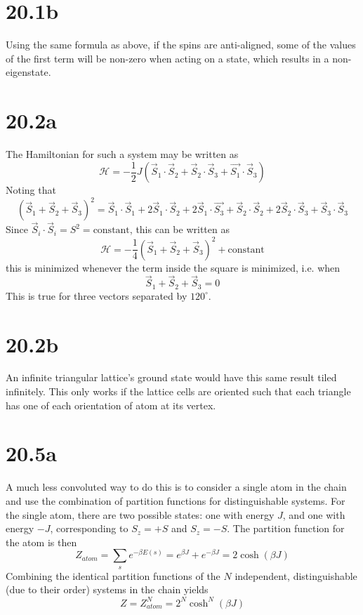 \documentclass{article}
\begin{document}
\section*{20.1b}
Using the same formula as above, if the spins are anti-aligned, some of the values of the first term will be non-zero when acting
on a state, which results in a non-eigenstate.

\section*{20.2a}
The Hamiltonian for such a system may be written as
\[
  \mathcal{H}=-\frac{1}{2}J(\vec{S}_{1}\cdot \vec{S}_{2}+\vec{S}_{2}\cdot \vec{S}_{3}+\vec{S_{1}}\cdot\vec{S}_{3})
\]
Noting that
\[
  (\vec{S}_{1}+\vec{S}_{2}+\vec{S}_{3})^{2}=\vec{S}_{1}\cdot\vec{S}_{1}+2\vec{S}_{1}\cdot\vec{S}_{2}+2\vec{S}_{1}\cdot\vec{S_{3}}
  +\vec{S}_{2}\cdot\vec{S}_{2}+2\vec{S}_{2}\cdot\vec{S}_{3}+\vec{S}_{3}\cdot\vec{S}_{3}
\]
Since $\vec{S}_{i}\cdot\vec{S}_{i}=S^{2}=\textrm{constant}$, this can be written as
\[
  \mathcal{H}=-\frac{1}{4}(\vec{S}_{1}+\vec{S}_{2}+\vec{S}_{3})^{2}+\textrm{constant}
\]
this is minimized whenever the term inside the square is minimized, i.e. when
\[
  \vec{S}_{1}+\vec{S}_{2}+\vec{S}_{3}=0
\]
This is true for three vectors separated by $120^{\circ}$.

\section*{20.2b}
An infinite triangular lattice's ground state would have this same result tiled infinitely.
This only works if the lattice cells are oriented such that each triangle has one of each orientation of atom at its vertex.

\section*{20.5a}
A much less convoluted way to do this is to consider a single atom in the chain and use the combination of partition functions
for distinguishable systems.
For the single atom, there are two possible states: one with energy $J$, and one with energy $-J$, corresponding to $S_{z}=+S$ and
$S_{z}=-S$.
The partition function for the atom is then
\[
  Z_{atom}=\sum_{s}e^{-\beta E(s)}=e^{\beta J}+e^{-\beta J}=2\cosh(\beta J)
\]
Combining the identical partition functions of the $N$ independent, distinguishable (due to their order) systems in the chain yields
\[
  Z=Z_{atom}^{N}=2^{N}\cosh^{N}(\beta J)
\]
\end{document}
